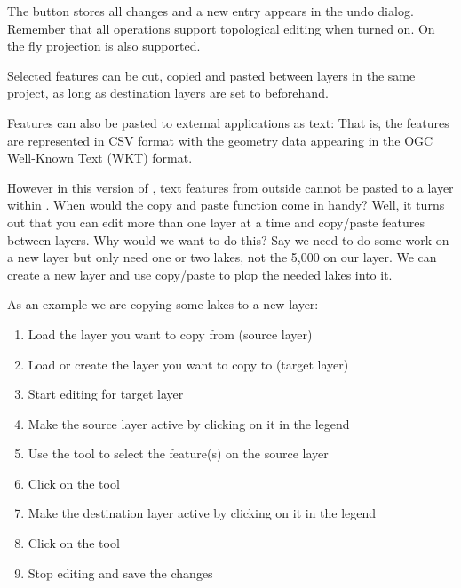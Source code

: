 The  button stores all changes and a new entry appears in the undo
dialog. Remember that all operations support topological editing when turned on. On
the fly projection is also supported.


Selected features can be cut, copied and pasted between layers in the
same \qg project, as long as destination layers are set to 
 beforehand.

Features can also be pasted to external applications as text:  That is,
the features are represented in CSV format with the geometry data appearing 
in the OGC Well-Known Text (WKT) format.

However in this version of \qg, text features from outside \qg cannot 
be pasted to a layer within \qg. When would the copy and paste function 
come in handy? Well, it turns out that you can edit more than one layer 
at a time and copy/paste features between layers. Why would we want to do 
this?  Say we need to do some work on a new layer but only need one or 
two lakes, not the 5,000 on our  layer. We can create 
a new layer and use copy/paste to plop the needed lakes into it. 

As an example we are copying some lakes to a new layer:

\begin{enumerate}
\item Load the layer you want to copy from (source layer)
\item Load or create the layer you want to copy to (target layer) 
\item Start editing for target layer
\item Make the source layer active by clicking on it in the legend 
\item Use the  tool to select the feature(s) on the source layer
\item Click on the  tool
\item Make the destination layer active by clicking on it in the legend 
\item Click on the  tool 
\item Stop editing and save the changes
\end{enumerate}

